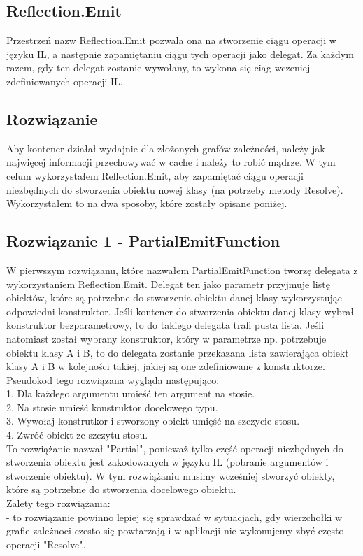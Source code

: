 \documentclass[12pt]{article}
\begin{document}
\subsection{Reflection.Emit}
Przestrzeń nazw Reflection.Emit pozwala ona na stworzenie ciągu operacji w języku IL, a następnie zapamiętaniu ciągu tych operacji jako delegat. Za każdym razem, gdy ten delegat zostanie wywołany, to wykona się ciąg wczeniej zdefiniowanych operacji IL.

\subsection{Rozwiązanie}
Aby kontener działał wydajnie dla złożonych grafów zależności, należy jak najwięcej informacji przechowywać w cache i należy to robić mądrze. W tym celum wykorzystałem Reflection.Emit, aby zapamiętać ciągu operacji niezbędnych do stworzenia obiektu nowej klasy (na potrzeby metody Resolve). Wykorzystałem to na dwa sposoby, które zostały opisane poniżej.

\subsection{Rozwiązanie 1 - PartialEmitFunction}
W pierwszym rozwiązanu, które nazwałem PartialEmitFunction tworzę delegata z wykorzystaniem Reflection.Emit. Delegat ten jako parametr przyjmuje listę obiektów, które są potrzebne do stworzenia obiektu danej klasy wykorzystując odpowiedni konstruktor. Jeśli kontener do stworzenia obiektu danej klasy wybrał konstruktor bezparametrowy, to do takiego delegata trafi pusta lista. Jeśli natomiast został wybrany konstruktor, który w parametrze np. potrzebuje obiektu klasy A i B, to do delegata zostanie przekazana lista zawierająca obiekt klasy A i B w kolejności takiej, jakiej są one zdefiniowane z konstruktorze.\\
Pseudokod tego rozwiązana wygląda następująco:\\
1. Dla każdego argumentu umieść ten argument na stosie.\\
2. Na stosie umieść konstruktor docelowego typu.\\
3. Wywołaj konstrutkor i stworzony obiekt umięść na szczycie stosu.\\
4. Zwróć obiekt ze szczytu stosu.\\
To rozwiążanie nazwał "Partial", ponieważ tylko część operacji niezbędnych do stworzenia obiektu jest zakodowanych w języku IL (pobranie argumentów i stworzenie obiektu). W tym rozwiążaniu musimy wcześniej stworzyć obiekty, które są potrzebne do stworzenia docelowego obiektu.\\
Zalety tego rozwiążania:\\
- to rozwiązanie powinno lepiej się sprawdzać w sytuacjach, gdy wierzchołki w grafie zależnoci czesto się powtarzają i w aplikacji nie wykonujemy zbyć często operacji "Resolve".
\end{document}
